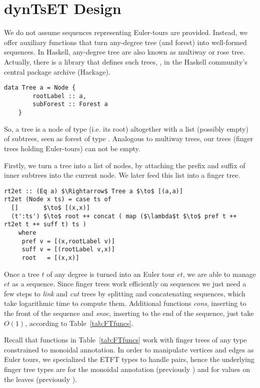 \section{dynTsET Design}
\label{sec:TechDes}  

We do not assume sequences representing Euler-tours are provided. Instead, we offer auxiliary functions that turn any-degree tree (and forest) into well-formed sequences. In Haskell, any-degree tree are also known as multiway or rose tree. Actually, there is a library that defines such trees, , in the Haskell community's central package archive (Hackage).

\begin{lstlisting}
data Tree a = Node {
        rootLabel :: a,         
        subForest :: Forest a   
    }
\end{lstlisting}

So, a tree is a node of type  (i.e. its root) altogether with a list (possibly empty) of subtrees, seen as forest of type . Analogous to multiway trees, our trees (finger trees holding Euler-tours) can not be empty. 

Firstly, we turn a tree into a list of nodes, by attaching the prefix and suffix of inner subtrees into the current node. We later feed this list into a finger tree. 

\begin{lstlisting}[mathescape] 
rt2et :: (Eq a) $\Rightarrow$ Tree a $\to$ [(a,a)] 
rt2et (Node x ts) = case ts of
  []       $\to$ [(x,x)]
  (t':ts') $\to$ root ++ concat ( map ($\lambda$t $\to$ pref t ++ rt2et t ++ suff t) ts )   
    where
     pref v = [(x,rootLabel v)]
     suff v = [(rootLabel v,x)]
     root   = [(x,x)] 
\end{lstlisting} 




Once a tree $t$ of any degree is turned into an Euler tour $et$, we are able to manage $et$ as a sequence. Since finger trees work efficiently on sequences we just need a few steps to \textit{link} and \textit{cut} trees by splitting and concatenating sequences, which take logarithmic time to compute them. Additional functions \textit{cons}, inserting to the front of the sequence and \textit{snoc}, inserting to the end of the sequence, just take $O(1)$, according to Table~\ref{tab:FTfuncs}.

Recall that functions in Table~\ref{tab:FTfuncs} work with finger trees of any type  constrained to  monoidal annotation. In order to manipulate vertices and edges as Euler tours, we specialized the ETFT types to handle  pairs, hence the underlying finger tree types are  for the monoidal annotation (previously ) and  for values on the leaves (previously ). 

